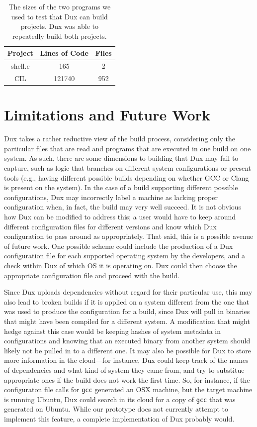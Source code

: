 \documentclass[10pt,conference]{IEEEtran}
\begin{document}
\begin{table}
\begin{center}
\begin{tabular}{ |c|c|c| }
 \hline
 Project & Lines of Code & Files \\ \hline \hline
 shell.c & 165 & 2 \\ \hline
 CIL & 121740 & 952 \\
 \hline
\end{tabular}
\caption{The sizes of the two programs we used to test that Dux can build projects. Dux was able to repeatedly
build both projects.}
\end{center}
\end{table}

\section{Limitations and Future Work}

Dux takes a rather reductive view of the build process, considering only the particular files that are read
and programs that are executed in one build on one system. As such, there are some dimensions to building that
Dux may fail to capture, such as logic that branches on different system configurations or present tools (e.g.,
having different possible builds depending on whether GCC or Clang is present on the system). In the case of
a build supporting different possible configurations, Dux may incorrectly label a machine as lacking proper
configuration when, in fact, the build may very well succeed. It is not obvious how Dux can be modified to address
this; a user would have to keep around different configuration files for different versions and know which
Dux configuration to pass around as appropriately. That said, this is a possible avenue of future work. One possible
scheme could include the production of a Dux configuration file for each supported operating system by the
developers, and a check within Dux of which OS it is operating on. Dux could then choose the appropriate
configuration file and proceed with the build.

Since Dux uploads dependencies without regard for their particular use, this may also lead to broken builds 
if it is applied on a system different from the one that was used to produce the configuration for a build, 
since Dux will pull in binaries that might have been compiled for a different system. A modification that
might hedge against this case would be keeping hashes of system metadata in configurations and knowing
that an executed binary from another system should likely not be pulled in to a different one. It may also
be possible for Dux to store more information in the cloud---for instance, Dux could keep track of the names
of dependencies and what kind of system they came from, and try to substitue appropriate ones if the build does
not work the first time. So, for instance, if the configuraton file calls for \texttt{gcc} generated an OSX machine,
but the target machine is running Ubuntu, Dux could search in its cloud for a copy of \texttt{gcc} that was
generated on Ubuntu. While our prototype does not currently attempt to implement this feature, a complete
implementation of Dux probably would.
\end{document}

